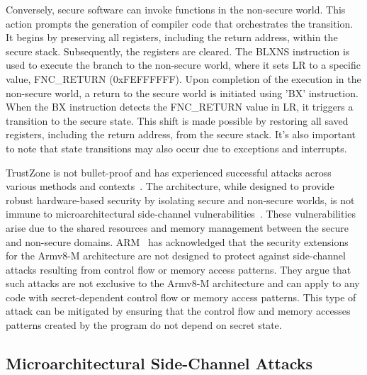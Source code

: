 Conversely, secure software can invoke functions in the non-secure world.
This action prompts the generation of compiler code that orchestrates the
transition. It begins by preserving all registers, including the return
address, within the secure stack. Subsequently, the registers are cleared.
The \ac{BLXNS} instruction is used to execute the branch to the non-secure
world, where it sets LR to a specific value, FNC\_RETURN (0xFEFFFFFF). Upon
completion of the execution in the non-secure world, a return to the secure
world is initiated using 'BX' instruction. When the BX instruction detects
the FNC\_RETURN value in LR, it triggers a transition to the secure state.
This shift is made possible by restoring all saved registers, including the
return address, from the secure stack. It's also important to note that
state transitions may also occur due to exceptions and interrupts.

TrustZone is not bullet-proof and has experienced successful attacks across
various methods and contexts~\cite{DemystifyingAT, surveyonTEE,
returntononsecure}. The architecture, while designed to provide robust
hardware-based security by isolating secure and non-secure worlds, is not
immune to microarchitectural side-channel
vulnerabilities~\cite{DemystifyingAT, busted, surveyonTEE, truspy,
Bypassed}. These vulnerabilities arise due to the shared resources and
memory management between the secure and non-secure domains.
ARM~\cite{armdeveloper} has acknowledged that the security extensions for
the Armv8-M architecture are not designed to protect against side-channel
attacks resulting from control flow or memory access patterns. They argue
that such attacks are not exclusive to the Armv8-M architecture and can
apply to any code with secret-dependent control flow or memory access
patterns. This type of attack can be mitigated by ensuring that the control
flow and memory accesses patterns created by the program do not depend on
secret state.

\subsection{Microarchitectural Side-Channel Attacks}

